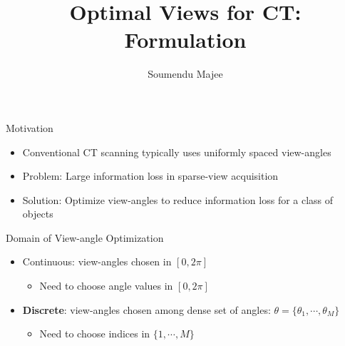 \documentclass[english,aspectratio=169]{beamer}
\title{Optimal Views for CT: Formulation}
\author{Soumendu Majee}
\date{}
\begin{document}
\begin{frame}
    \titlepage
\end{frame}


\begin{frame}{Motivation}
	\begin{itemize}
	    \setlength\itemsep{2em}
		\item Conventional CT scanning typically uses uniformly spaced view-angles
		
		\item Problem: Large information loss in sparse-view acquisition
		
		\item Solution: Optimize view-angles to reduce information loss for a class of objects
		
		
	\end{itemize}
\end{frame}

\begin{frame}{Domain of View-angle Optimization}
	\begin{itemize}
	    \setlength\itemsep{2em}
		\item Continuous: view-angles chosen in $[0, 2\pi]$
		\begin{itemize}
		    \item Need to choose angle values in $[0, 2\pi]$
	    \end{itemize}
		
		\item \textbf{Discrete}: view-angles chosen among dense set of angles: $\theta = \{\theta_1, \cdots, \theta_M \}$
		\begin{itemize}
		    \item Need to choose indices in $\{ 1, \cdots, M \}$
		
	    \end{itemize}
		
		
	\end{itemize}
\end{frame}
\end{document}
